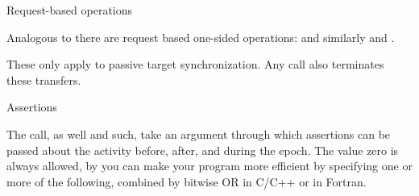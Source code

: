  {Request-based operations}

Analogous to  there are request based one-sided operations:
%
%
and similarly  and .

These only apply to passive target synchronization.
Any  call also terminates these transfers.

 {Assertions}
\label{sec:mpi-assert}

The  call, as well  and such, take an argument
through which assertions can be passed about the activity before, after, and during the epoch.
The value zero is always allowed, by you can make your program more efficient by specifying
one or more of the following, combined by bitwise OR in C/C++ or
 in Fortran.

